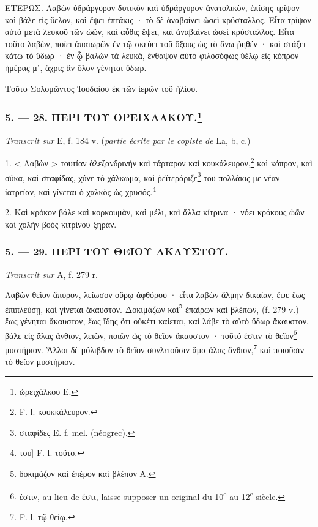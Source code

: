 \documentclass[a4paper, 11pt, oneside, polutonikogreek, french]{article}
\begin{document}
ΕΤΕΡΩΣ. Λαβὼν ὑδράργυρον δυτικὸν καὶ ὑδράργυρον ἀνατολικὸν, ἐπίσης τρίψον καὶ βάλε εἰς ὕελον, καὶ ἕψει ἑπτάκις · τὸ δὲ ἀναβαίνει ὡσεὶ κρύσταλλος. Εἶτα τρίψον αὐτὸ μετὰ λευκοῦ τῶν ὠῶν, καὶ αὖθις ἕψει, καὶ ἀναβαίνει ὡσεὶ κρύσταλλος. Εἶτα τοῦτο λαβὼν, ποίει ἀπαιωρῶν ἐν τῷ σκεύει τοῦ ὄξους ὡς τὸ ἄνω ῥηθέν · καὶ στάζει κάτω τὸ ὕδωρ · ἐν ᾧ βαλὼν τὰ λευκὰ, ἔνθαψον αὐτὸ φιλοσόφως ὑέλῳ εἰς κόπρον ἡμέρας μʹ, ἄχρις ἂν ὅλον γένηται ὕδωρ.

Τοῦτο Σολομῶντος Ἰουδαίου ἐκ τῶν ἱερῶν τοῦ ἡλίου.

\bigskip
\centerline{\EightStarTaper}
\centerline{\EightStarTaper\EightStarTaper}
\bigskip

\subsubsection[5. --- 28. ΠΕΡΙ ΤΟΥ ΟΡΕΙΧΑΛΚΟΥ.]{5. --- 28. ΠΕΡΙ ΤΟΥ ΟΡΕΙΧΑΛΚΟΥ.\footnote{ὠρειχάλκου E.}}

\emph{Transcrit sur} E, f. 184 v. (\emph{partie écrite par le copiste de} La, b, c.)

\bigskip

1. < Λαβὼν > τουτίαν ἀλεξανδρινὴν καὶ τάρταρον καὶ κουκάλευρον,\footnote{F. l. κουκκάλευρον.} καὶ κόπρον, καὶ σύκα, καὶ σταφίδας, χύνε τὸ χάλκωμα, καὶ ῥεϊτεράριζε\footnote{σταφίδες E. f. mel. (néogrec).} του πολλάκις με νέαν ἰατρείαν, καὶ γίνεται ὁ χαλκὸς ὡς χρυσός.\footnote{του] F. l. τοῦτο.}

2. Καὶ κρόκον βάλε καὶ κορκουμὰν, καὶ μέλι, καὶ ἄλλα κίτρινα · νόει κρόκους ὠῶν καὶ χολὴν βοὸς κιτρίνου ξηράν.

\bigskip
\centerline{\EightStarTaper}
\centerline{\EightStarTaper\EightStarTaper}
\bigskip

\subsubsection{5. --- 29. ΠΕΡΙ ΤΟΥ ΘΕΙΟΥ ΑΚΑΥΣΤΟΥ.}

\emph{Transcrit sur} A, f. 279 r.

\bigskip

Λαβὼν θεῖον ἄπυρον, λείωσον οὔρῳ ἀφθόρου · εἶτα λαβὼν ἅλμην δικαίαν, ἕψε ἕως ἐπιπλεύσῃ, καὶ γίνεται ἄκαυστον. Δοκιμάζων καὶ\footnote{δοκιμάζον καὶ ἐπέρον καὶ βλέπον A.} ἐπαίρων καὶ βλέπων, (f. 279 v.) ἕως γένηται ἄκαυστον, ἕως ἴδῃς ὅτι οὐκέτι καίεται, καὶ λάβε τὸ αὐτὸ ὕδωρ ἄκαυστον, βάλε εἰς ἅλας ἄνθιον, λειῶν, ποιῶν ὡς τὸ θεῖον ἄκαυστον · τοῦτό ἐστιν τὸ θεῖον\footnote{ἐστιν, au lieu de ἐστι, laisse supposer un original du 10\textsuperscript{e} au 12\textsuperscript{e} siècle.} μυστήριον. Ἄλλοι δὲ μόλιβδον τὸ θεῖον συνλειοῦσιν ἅμα ἅλας ἄνθιον,\footnote{F. l. τῷ θείῳ.} καὶ ποιοῦσιν τὸ θεῖον μυστήριον.
\end{document}
